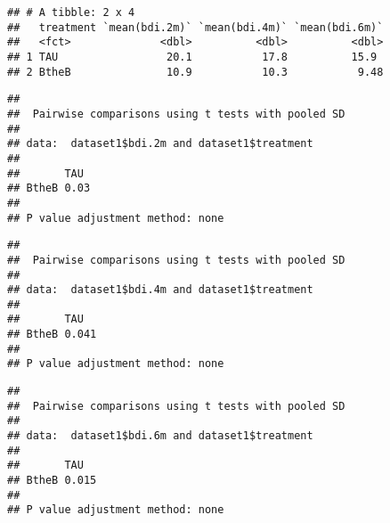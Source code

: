 \documentclass[
]{article}
\newenvironment{Shaded}{\begin{snugshade}}{\end{snugshade}}
\newcommand{\DataTypeTok}[1]{\textcolor[rgb]{0.13,0.29,0.53}{#1}}
\newcommand{\FloatTok}[1]{\textcolor[rgb]{0.00,0.00,0.81}{#1}}
\newcommand{\KeywordTok}[1]{\textcolor[rgb]{0.13,0.29,0.53}{\textbf{#1}}}
\newcommand{\NormalTok}[1]{#1}
\newcommand{\OperatorTok}[1]{\textcolor[rgb]{0.81,0.36,0.00}{\textbf{#1}}}
\newcommand{\StringTok}[1]{\textcolor[rgb]{0.31,0.60,0.02}{#1}}
\begin{document}
\begin{verbatim}
## # A tibble: 2 x 4
##   treatment `mean(bdi.2m)` `mean(bdi.4m)` `mean(bdi.6m)`
##   <fct>              <dbl>          <dbl>          <dbl>
## 1 TAU                 20.1           17.8          15.9 
## 2 BtheB               10.9           10.3           9.48
\end{verbatim}

\begin{Shaded}
\end{Shaded}

\begin{verbatim}
## 
##  Pairwise comparisons using t tests with pooled SD 
## 
## data:  dataset1$bdi.2m and dataset1$treatment 
## 
##       TAU 
## BtheB 0.03
## 
## P value adjustment method: none
\end{verbatim}

\begin{Shaded}
\end{Shaded}

\begin{verbatim}
## 
##  Pairwise comparisons using t tests with pooled SD 
## 
## data:  dataset1$bdi.4m and dataset1$treatment 
## 
##       TAU  
## BtheB 0.041
## 
## P value adjustment method: none
\end{verbatim}

\begin{Shaded}
\end{Shaded}

\begin{verbatim}
## 
##  Pairwise comparisons using t tests with pooled SD 
## 
## data:  dataset1$bdi.6m and dataset1$treatment 
## 
##       TAU  
## BtheB 0.015
## 
## P value adjustment method: none
\end{verbatim}
\end{document}

